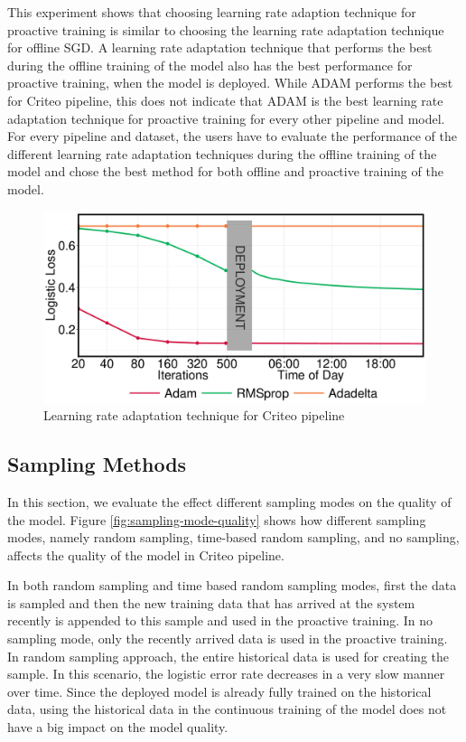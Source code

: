 This experiment shows that choosing learning rate adaption technique for proactive training is similar to choosing the learning rate adaptation technique for offline SGD.
A learning rate adaptation technique that performs the best during the offline training of the model also has the best performance for proactive training, when the model is deployed.
While ADAM performs the best for Criteo pipeline, this does not indicate that ADAM is the best learning rate adaptation technique for proactive training for every other pipeline and model.
For every pipeline and dataset, the users have to evaluate the performance of the different learning rate adaptation techniques during the offline training of the model and chose the best method for both offline and proactive training of the model.

\begin{figure}[h!]
\includegraphics[width=\columnwidth]{../images/experiment-results/criteo-learning-rate-experiment.pdf}
\caption{Learning rate adaptation technique for Criteo pipeline}
\label{fig:criteo-learning-rate}
\end{figure}

\subsection{Sampling Methods}
In this section, we evaluate the effect different sampling modes on the quality of the model.
Figure \ref{fig:sampling-mode-quality} shows how different sampling modes, namely random sampling, time-based random sampling, and no sampling, affects the quality of the model in Criteo pipeline.

In both random sampling and time based random sampling modes, first the data is sampled and then the new training data that has arrived at the system recently is appended to this sample and used in the proactive training.
In no sampling mode, only the recently arrived data is used in the proactive training.
In random sampling approach, the entire historical data is used for creating the sample.
In this scenario, the logistic error rate decreases in a very slow manner over time.
Since the deployed model is already fully trained on the historical data, using the historical data in the continuous training of the model does not have a big impact on the model quality.

